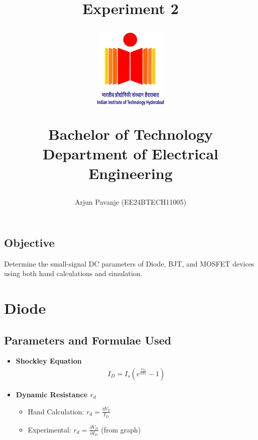 \documentclass{article}
\begin{document}
\title{\textbf{Experiment 2}\\
\LARGE{\textbf{ }}
\author{ Arjun Pavanje (EE24BTECH11005)}

\begin{center}
\end{center}
\vspace{30pt}
\begin{figure}[ht]
	\centering
	\includegraphics[width = 100pt]{logo.png}\\
\end{figure}
\begin{center}
	Bachelor of Technology\\
	\vspace{10pt}
	Department of Electrical Engineering\\
\end{center}
}
\maketitle
\begin{center}
\section*{Objective}
Determine the small-signal DC parameters of Diode, BJT, and MOSFET devices using both hand calculations and simulation.
\end{center}
\pagebreak
\section{Diode}
\subsection*{Parameters and Formulae Used}

\begin{itemize}
    \item \textbf{Shockley Equation}
    \begin{align*}
I_D = I_s \left( e^{\frac{V_D}{n V_T}} - 1 \right)
\end{align*}

    \item \textbf{Dynamic Resistance $r_d$}
    \begin{itemize}
        \item Hand Calculation: $r_d = \frac{\eta V_T}{I_D}$
        \item Experimental: $r_d = \frac{\partial V_{D}}{\partial I_{D}}$ (from graph)
    \end{itemize}
\end{itemize}
\end{document}
